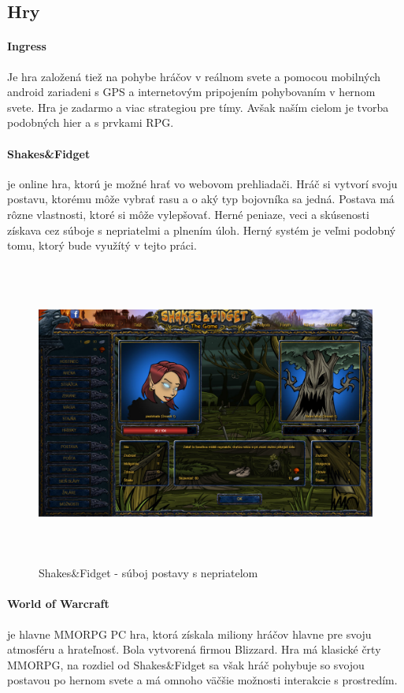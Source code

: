 \subsection{Hry}
\paragraph{Ingress} Je hra založená tiež na pohybe hráčov v reálnom svete a pomocou mobilných android zariadeni s GPS a internetovým pripojením pohybovaním v hernom svete. Hra je zadarmo a viac strategiou pre tímy. Avšak naším cielom je tvorba podobných hier a s prvkami RPG.


\paragraph{Shakes\&Fidget} je online hra, ktorú je možné hrať vo webovom prehliadači\cite{sfgame}. Hráč si vytvorí svoju postavu, ktorému môže vybrať rasu a o aký typ bojovníka sa jedná. Postava má rôzne vlastnosti, ktoré si môže vylepšovať. Herné peniaze, veci a skúsenosti získava cez súboje s nepriatelmi a plnením úloh. Herný systém je veľmi podobný tomu, ktorý bude využítý v tejto práci.

\begin{figure}
  \centering
  \includegraphics[height=10cm]{mainmatter/imgs/shakes.png}
  \caption{Shakes\&Fidget - súboj postavy s nepriatelom}
  \label{fig:comenius}
\end{figure}


\paragraph{World of Warcraft} je hlavne MMORPG PC hra, ktorá získala miliony hráčov hlavne pre svoju atmosféru a hrateľnosť. Bola vytvorená firmou Blizzard\cite{wow-blizard}. Hra má klasické črty MMORPG, na rozdiel od Shakes\&Fidget sa však hráč pohybuje so svojou postavou po hernom svete a má omnoho väčšie možnosti interakcie s prostredím\cite{wow-blizard-guide}. 


